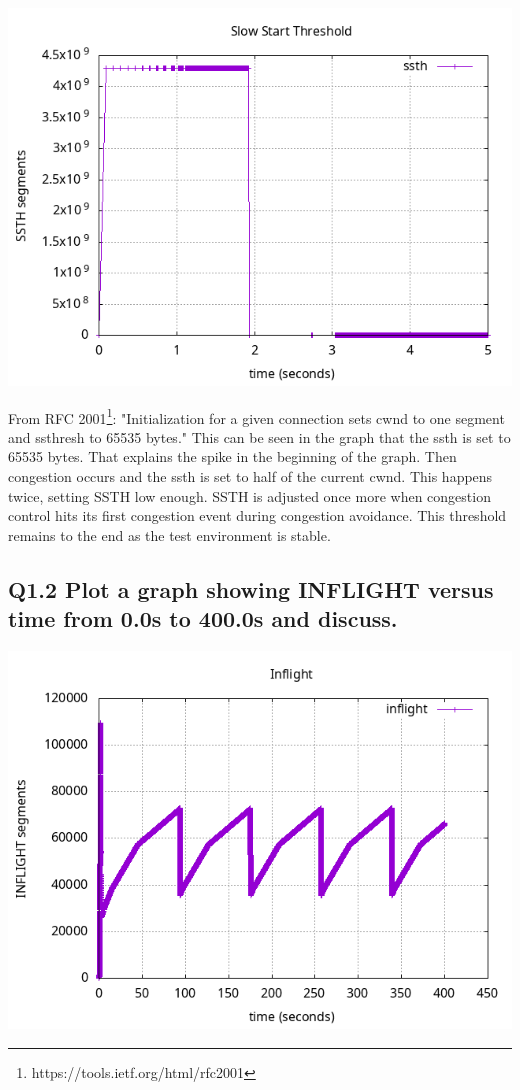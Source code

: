 \documentclass{article}
\begin{document}
\includegraphics[scale=0.5]{plots/lab1-group5-task1-question1.1-xrange-0-5.png}

From RFC 2001\footnote{https://tools.ietf.org/html/rfc2001}: "Initialization for a given connection sets cwnd to one segment and ssthresh to 65535 bytes." This can be seen in the graph that the ssth is set to 65535 bytes. That explains the spike in the beginning of the graph. Then congestion occurs and the ssth is set to half of the current cwnd. This happens twice, setting SSTH low enough. SSTH is adjusted once more when congestion control hits its first congestion event during congestion avoidance. This threshold remains to the end as the test environment is stable.

\subsection{Q1.2 Plot a graph showing INFLIGHT versus time from 0.0s to
400.0s and discuss.}

\includegraphics[scale=0.5]{plots/lab1-group5-task1-question1.2.png}
\end{document}
